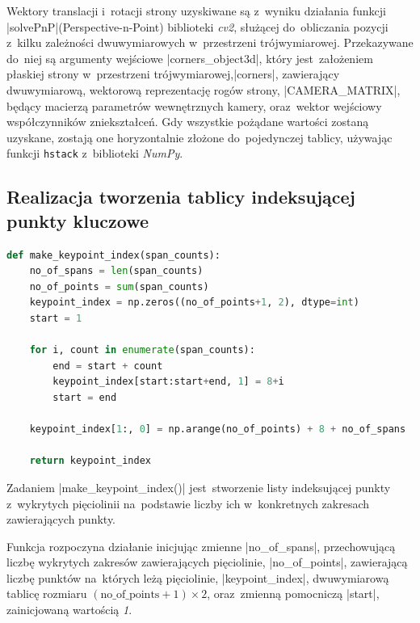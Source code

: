Wektory translacji i~rotacji strony uzyskiwane są z~wyniku działania funkcji \pyth|solvePnP|\linebreak(Perspective-n-Point) biblioteki \textit{cv2}, służącej do~obliczania pozycji z~kilku zależności dwuwymiarowych w~przestrzeni trójwymiarowej. Przekazywane do~niej są argumenty wejściowe \linebreak \pyth|corners_object3d|, który jest~założeniem płaskiej strony w~przestrzeni trójwymiarowej,\linebreak \pyth|corners|, zawierający dwuwymiarową, wektorową reprezentację rogów strony, \pyth|CAMERA_MATRIX|, będący macierzą parametrów wewnętrznych kamery, oraz~wektor wejściowy współczynników \linebreak zniekształceń. Gdy wszystkie pożądane wartości zostaną uzyskane, zostają one horyzontalnie złożone do~pojedynczej tablicy, używając funkcji \lstinline|hstack| z~biblioteki \textit{NumPy}.

\newpage

\subsection{Realizacja tworzenia tablicy indeksującej punkty kluczowe}
\begin{lstlisting}[caption={\pyth|make_keypoint_index()| - funkcja tworząca indeksy punktów kluczowych.}, label={make-keypoint-index}, language=Python]
def make_keypoint_index(span_counts):	
	no_of_spans = len(span_counts)
	no_of_points = sum(span_counts)
	keypoint_index = np.zeros((no_of_points+1, 2), dtype=int)
	start = 1
	
	for i, count in enumerate(span_counts):
		end = start + count
		keypoint_index[start:start+end, 1] = 8+i
		start = end
	
	keypoint_index[1:, 0] = np.arange(no_of_points) + 8 + no_of_spans
	
	return keypoint_index
\end{lstlisting}

Zadaniem \pyth|make_keypoint_index()| jest~stworzenie listy indeksującej punkty z~wykrytych \linebreak pięciolinii na~podstawie liczby ich w~konkretnych zakresach zawierających punkty.

Funkcja rozpoczyna działanie inicjując zmienne \pyth|no_of_spans|, przechowującą liczbę wykrytych zakresów zawierających pięciolinie, \pyth|no_of_points|, zawierającą liczbę punktów na~których leżą \linebreak pięciolinie, \pyth|keypoint_index|, dwuwymiarową tablicę rozmiaru $(\text{no\_of\_points} + 1) \times 2$, oraz~zmienną pomocniczą \pyth|start|, zainicjowaną wartością \textit{1}.

